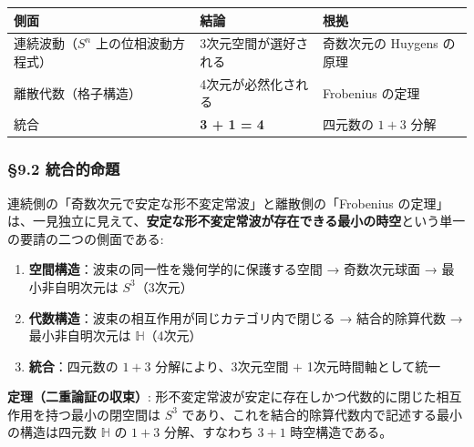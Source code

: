 \documentclass[
  a4paper,11pt]{ltjsarticle}
\newcounter{none}
\providecommand{\tightlist}{%
  \setlength{\itemsep}{0pt}\setlength{\parskip}{0pt}}
\theoremstyle{definition}
\theoremstyle{remark}
\begin{document}
{\def\LTcaptype{none} %
\begin{longtable}[]{@{}
  >{\raggedright\arraybackslash}p{}
  >{\raggedright\arraybackslash}p{}
  >{\raggedright\arraybackslash}p{}@{}}
\toprule\noalign{}
\begin{minipage}[b]{\linewidth}\raggedright
側面
\end{minipage} & \begin{minipage}[b]{\linewidth}\raggedright
結論
\end{minipage} & \begin{minipage}[b]{\linewidth}\raggedright
根拠
\end{minipage} \\
\midrule\noalign{}
\endhead
\bottomrule\noalign{}
\endlastfoot
連続波動（\(S^n\) 上の位相波動方程式） & 3次元空間が選好される &
奇数次元の Huygens の原理 \\
離散代数（格子構造） & 4次元が必然化される & Frobenius の定理 \\
統合 & \textbf{3 + 1 = 4} & 四元数の \(1+3\) 分解 \\
\end{longtable}
}

\subsubsection{§9.2 統合的命題}\label{ux7d71ux5408ux7684ux547dux984c}

連続側の「奇数次元で安定な形不変定常波」と離散側の「Frobenius
の定理」は、一見独立に見えて、\textbf{安定な形不変定常波が存在できる最小の時空}という単一の要請の二つの側面である:

\begin{enumerate}
\def\labelenumi{\arabic{enumi}.}
\tightlist
\item
  \textbf{空間構造}：波束の同一性を幾何学的に保護する空間 → 奇数次元球面
  → 最小非自明次元は \(S^3\)（3次元）
\item
  \textbf{代数構造}：波束の相互作用が同じカテゴリ内で閉じる →
  結合的除算代数 → 最小非自明次元は \(\mathbb{H}\)（4次元）
\item
  \textbf{統合}：四元数の \(1+3\) 分解により、3次元空間 \(+\)
  1次元時間軸として統一
\end{enumerate}

\textbf{定理（二重論証の収束）}:
形不変定常波が安定に存在しかつ代数的に閉じた相互作用を持つ最小の閉空間は
\(S^3\) であり、これを結合的除算代数内で記述する最小の構造は四元数
\(\mathbb{H}\) の \(1+3\) 分解、すなわち \(3+1\) 時空構造である。
\end{document}
